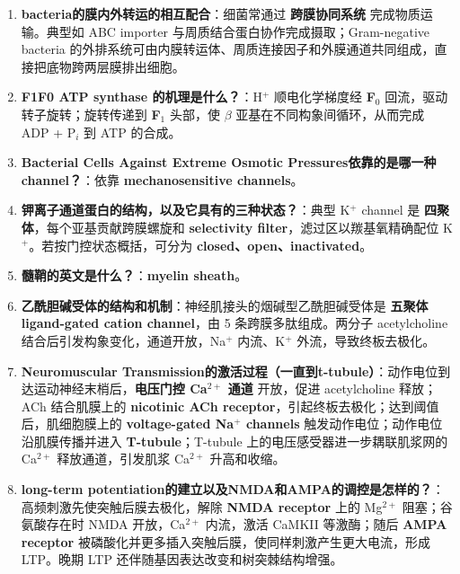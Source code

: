 \documentclass[12pt,fontset=none]{ctexart}
\begin{document}
\begin{enumerate}
\item \textbf{bacteria的膜内外转运的相互配合}：细菌常通过 \textbf{跨膜协同系统} 完成物质运输。典型如 ABC importer 与周质结合蛋白协作完成摄取；Gram-negative bacteria 的外排系统可由内膜转运体、周质连接因子和外膜通道共同组成，直接把底物跨两层膜排出细胞。

\item \textbf{F1F0 ATP synthase 的机理是什么？}：H$^+$ 顺电化学梯度经 \textbf{F$_0$} 回流，驱动转子旋转；旋转传递到 \textbf{F$_1$} 头部，使 $\beta$ 亚基在不同构象间循环，从而完成 ADP + P$_i$ 到 ATP 的合成。

\item \textbf{Bacterial Cells Against Extreme Osmotic Pressures依靠的是哪一种channel？}：依靠 \textbf{mechanosensitive channels}。

\item \textbf{钾离子通道蛋白的结构，以及它具有的三种状态？}：典型 K$^+$ channel 是 \textbf{四聚体}，每个亚基贡献跨膜螺旋和 \textbf{selectivity filter}，滤过区以羰基氧精确配位 K$^+$。若按门控状态概括，可分为 \textbf{closed、open、inactivated}。

\item \textbf{髓鞘的英文是什么？}：\textbf{myelin sheath}。

\item \textbf{乙酰胆碱受体的结构和机制}：神经肌接头的烟碱型乙酰胆碱受体是 \textbf{五聚体 ligand-gated cation channel}，由 5 条跨膜多肽组成。两分子 acetylcholine 结合后引发构象变化，通道开放，Na$^+$ 内流、K$^+$ 外流，导致终板去极化。

\item \textbf{Neuromuscular Transmission的激活过程（一直到t-tubule）}：动作电位到达运动神经末梢后，\textbf{电压门控 Ca$^{2+}$ 通道} 开放，促进 acetylcholine 释放；ACh 结合肌膜上的 \textbf{nicotinic ACh receptor}，引起终板去极化；达到阈值后，肌细胞膜上的 \textbf{voltage-gated Na$^+$ channels} 触发动作电位；动作电位沿肌膜传播并进入 \textbf{T-tubule}；T-tubule 上的电压感受器进一步耦联肌浆网的 Ca$^{2+}$ 释放通道，引发肌浆 Ca$^{2+}$ 升高和收缩。

\item \textbf{long-term potentiation的建立以及NMDA和AMPA的调控是怎样的？}：高频刺激先使突触后膜去极化，解除 \textbf{NMDA receptor} 上的 Mg$^{2+}$ 阻塞；谷氨酸存在时 NMDA 开放，Ca$^{2+}$ 内流，激活 CaMKII 等激酶；随后 \textbf{AMPA receptor} 被磷酸化并更多插入突触后膜，使同样刺激产生更大电流，形成 LTP。晚期 LTP 还伴随基因表达改变和树突棘结构增强。

\end{enumerate}
\end{document}
